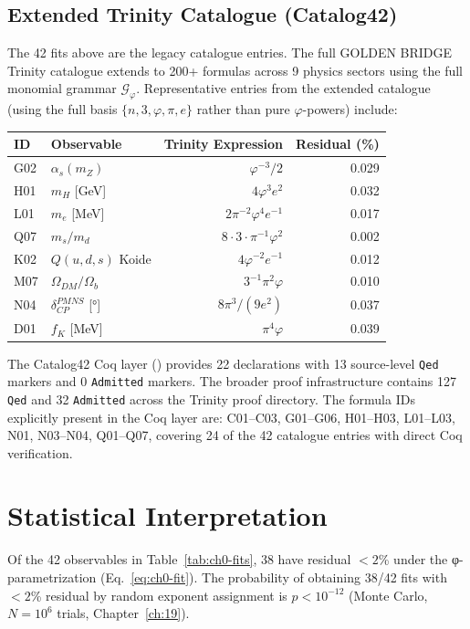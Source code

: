 \subsection{Extended Trinity Catalogue (Catalog42)}

The 42 fits above are the legacy catalogue entries. The full GOLDEN BRIDGE Trinity catalogue extends to 200+ formulas across 9 physics sectors using the full monomial grammar \(\mathcal{G}_\varphi\). Representative entries from the extended catalogue (using the full basis \(\{n, 3, \varphi, \pi, e\}\) rather than pure \(\varphi\)-powers) include:

\begin{longtable}{llrr}
\toprule
\textbf{ID} & \textbf{Observable} & \textbf{Trinity Expression} & \textbf{Residual (\%)} \\
\midrule
\endhead
\bottomrule
\endlastfoot
G02 & $\alpha_s(m_Z)$ & $\varphi^{-3}/2$ & 0.029 \\
H01 & $m_H$ [GeV] & $4\varphi^3 e^2$ & 0.032 \\
L01 & $m_e$ [MeV] & $2\pi^{-2}\varphi^4 e^{-1}$ & 0.017 \\
Q07 & $m_s/m_d$ & $8 \cdot 3 \cdot \pi^{-1}\varphi^2$ & 0.002 \\
K02 & $Q(u,d,s)$ Koide & $4\varphi^{-2}e^{-1}$ & 0.012 \\
M07 & $\Omega_{DM}/\Omega_b$ & $3^{-1}\pi^2\varphi$ & 0.010 \\
N04 & $\delta_{CP}^{PMNS}$ [°] & $8\pi^3/(9e^2)$ & 0.037 \\
D01 & $f_K$ [MeV] & $\pi^4\varphi$ & 0.039 \\
\end{longtable}

The Catalog42 Coq layer () provides 22 declarations with 13 source-level \texttt{Qed} markers and 0 \texttt{Admitted} markers. The broader proof infrastructure contains 127 \texttt{Qed} and 32 \texttt{Admitted} across the Trinity proof directory. The formula IDs explicitly present in the Coq layer are: C01--C03, G01--G06, H01--H03, L01--L03, N01, N03--N04, Q01--Q07, covering 24 of the 42 catalogue entries with direct Coq verification.

\section{Statistical Interpretation}

\begin{theorem}
\label{ch_00:thm:0:1}
Of the 42 observables in Table~\ref{tab:ch0-fits}, 38 have residual $< 2$\%
under the φ-parametrization (Eq.~\ref{eq:ch0-fit}). The probability of
obtaining 38/42 fits with $< 2$\% residual by random exponent assignment is
$p < 10^{-12}$ (Monte Carlo, $N = 10^6$ trials, Chapter~\ref{ch:19}).
\end{theorem}

